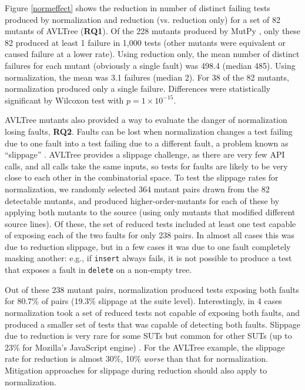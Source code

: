 Figure \ref{normeffect} shows the reduction in number of distinct
failing tests produced by normalization and reduction
(vs. reduction only) for a set of 82 mutants \cite{mutant} of AVLTree
\cite{Hunter:2007} ({\bf RQ1}).  Of the 228 mutants produced by MutPy
\cite{mutpy}, only these 82 produced at least 1 failure in 1,000 tests (other mutants were equivalent or caused failure at a lower
rate).  Using reduction only, the mean number of distinct failures for
each mutant (obviously a single fault) was 498.4 (median 485).  Using normalization, the mean
was 3.1 failures (median 2).  For 38 of the 82 mutants,
normalization produced only a single failure.
Differences were statistically significant by Wilcoxon test with
$p=1\times10^{-15}$.


AVLTree mutants also provided a way to evaluate the danger of
normalization losing faults, {\bf RQ2}.  Faults can be lost when normalization
changes a test failing due to one fault into a test failing
due to a different fault, a problem known as ``slippage''
\cite{PLDI13,slippage}.  AVLTree provides a slippage challenge, as there are
very few API calls, and all calls take the same inputs, so tests
for faults are likely to be very close to each other in the
combinatorial space.  To test the slippage rates for normalization, we
randomly selected 364 mutant pairs drawn from the 82 detectable
mutants, and produced higher-order-mutants for each of these by
applying both mutants to the source (using only mutants that modified
different source lines).  Of these, the set of reduced tests
included at least one test capable of exposing each of the two faults
for only 238 pairs.  In almost all cases this was due to reduction
slippage, but in a few cases it was due to one fault completely
masking another: e.g., if {\tt insert} always fails, it is not
possible to produce a test that exposes a fault in {\tt delete}
on a non-empty tree.

Out of these 238 mutant pairs, normalization produced tests
exposing both faults for 80.7\% of pairs (19.3\% slippage at the
suite level).  Interestingly, in 4 cases
normalization took a set of reduced tests not capable of exposing
both faults, and produced a smaller set of tests that was capable
of detecting both faults.  Slippage due to
reduction is very rare for some SUTs but common
for other SUTs (up to 23\% for Mozilla's JavaScript engine) \cite{PLDI13}.  For the AVLTree example, the slippage rate for reduction is almost 30\%,
10\% \emph{worse} than that for normalization.  Mitigation approaches
for slippage during reduction \cite{slippage} should also apply to normalization.

